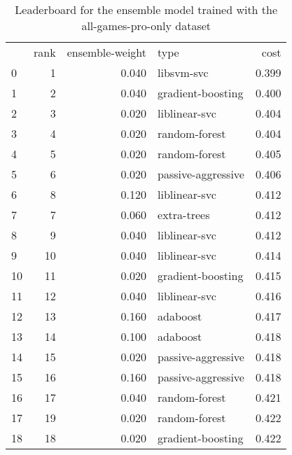 \begin{table}[]
	\centering
	\begin{tabular}{lrrlr}
		   & rank & ensemble-weight & type               & cost  \\
		0  & 1    & 0.040           & libsvm-svc         & 0.399 \\
		1  & 2    & 0.040           & gradient-boosting  & 0.400 \\
		2  & 3    & 0.020           & liblinear-svc      & 0.404 \\
		3  & 4    & 0.020           & random-forest      & 0.404 \\
		4  & 5    & 0.020           & random-forest      & 0.405 \\
		5  & 6    & 0.020           & passive-aggressive & 0.406 \\
		6  & 8    & 0.120           & liblinear-svc      & 0.412 \\
		7  & 7    & 0.060           & extra-trees        & 0.412 \\
		8  & 9    & 0.040           & liblinear-svc      & 0.412 \\
		9  & 10   & 0.040           & liblinear-svc      & 0.414 \\
		10 & 11   & 0.020           & gradient-boosting  & 0.415 \\
		11 & 12   & 0.040           & liblinear-svc      & 0.416 \\
		12 & 13   & 0.160           & adaboost           & 0.417 \\
		13 & 14   & 0.100           & adaboost           & 0.418 \\
		14 & 15   & 0.020           & passive-aggressive & 0.418 \\
		15 & 16   & 0.160           & passive-aggressive & 0.418 \\
		16 & 17   & 0.040           & random-forest      & 0.421 \\
		17 & 19   & 0.020           & random-forest      & 0.422 \\
		18 & 18   & 0.020           & gradient-boosting  & 0.422 \\
	\end{tabular}

	\caption{Leaderboard for the ensemble model trained with the all-games-pro-only dataset}
	\label{tab:lb-all-games-pro-only-randsplit}
\end{table}

